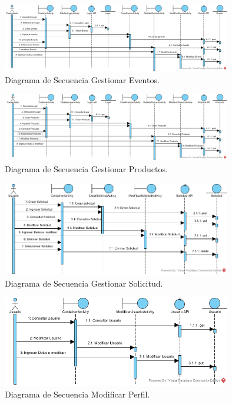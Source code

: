 \documentclass[12pt,letterpaper,openany]{book}
\begin{document}
\begin{figure}[H]
\begin{center}
\includegraphics[width=10cm]{./imagenes/DS/DS_gestionar_eventos}
\caption{Diagrama de Secuencia Gestionar Eventos.}
\end{center}
\end{figure}

\begin{figure}[H]
\begin{center}
\includegraphics[width=10cm]{./imagenes/DS/DS_gestionar_producto}
\caption{Diagrama de Secuencia Gestionar Productos.}
\end{center}
\end{figure}

\begin{figure}[H]
\begin{center}
\includegraphics[width=10cm]{./imagenes/DS/DS_gestionar_solicitud}
\caption{Diagrama de Secuencia Gestionar Solicitud.}
\end{center}
\end{figure}

\begin{figure}[H]
\begin{center}
\includegraphics[width=10cm]{./imagenes/DS/DS_modificar_perfil}
\caption{Diagrama de Secuencia Modificar Perfil.}
\end{center}
\end{figure}
\end{document}
